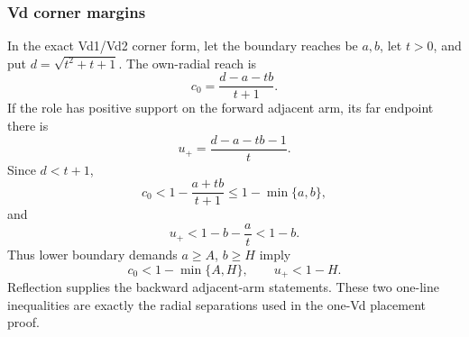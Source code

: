 \subsubsection{Vd corner margins}

In the exact Vd1/Vd2 corner form, let the boundary reaches be $a,b$, let
$t>0$, and put $d=\sqrt{t^2+t+1}$.  The own-radial reach is
\[
 c_0=\frac{d-a-tb}{t+1}.
\]
If the role has positive support on the forward adjacent arm, its far endpoint
there is
\[
 u_+=\frac{d-a-tb-1}{t}.
\]
Since $d<t+1$,
\[
 c_0<1-\frac{a+tb}{t+1}
 \le1-\min\{a,b\},
 \tag{6.70}
\]
and
\[
 u_+<1-b-\frac at<1-b.
 \tag{6.71}
\]
Thus lower boundary demands $a\ge A$, $b\ge H$ imply
\[
 c_0<1-\min\{A,H\},
 \qquad
 u_+<1-H.
\]
Reflection supplies the backward adjacent-arm statements.  These two
one-line inequalities are exactly the radial separations used in the one-Vd
placement proof.
